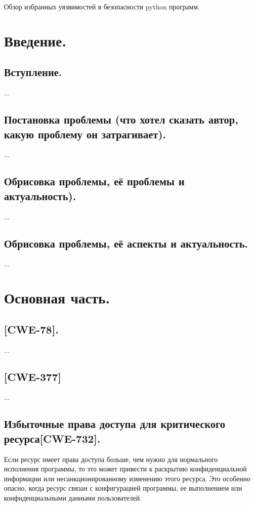 \documentclass{article}
\begin{document}
	\begin{titlepage}
		Обзор избранных уязвимостей в безопасности python программ.
	\end{titlepage}

	\section{Введение.}
		\subsection{Вступление.}
			...
		\subsection{Постановка проблемы (что хотел сказать автор, какую проблему он затрагивает).}
            ...
		\subsection{Обрисовка проблемы, её проблемы и актуальность).}
            ...
		\subsection{Обрисовка проблемы, её аспекты и актуальность.}
            ...

	\newpage

	\section{Основная часть.}
		\subsection{[CWE-78].}
			...

		\subsection{[CWE-377]}
			...

		\subsection{Избыточные права доступа для критического ресурса[CWE-732].}
			Если ресурс имеет права доступа больше, чем нужно для нормального исполнения программы, то это может привести к раскрытию конфиденциальной информации или несанкционированному изменению этого ресурса. Это особенно опасно, когда ресурс связан с конфигурацией программы, ее выполнением или конфиденциальными данными пользователей.
\end{document}
